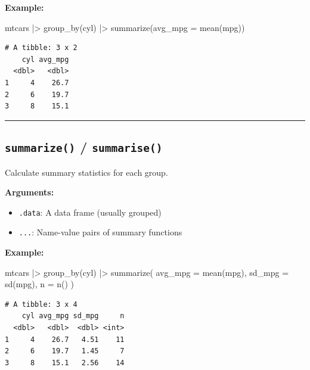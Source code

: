 \documentclass[
  letterpaper,
  DIV=11,
  numbers=noendperiod]{scrreprt}
\newenvironment{Shaded}{\begin{snugshade}}{\end{snugshade}}
\newcommand{\AttributeTok}[1]{\textcolor[rgb]{0.40,0.45,0.13}{#1}}
\newcommand{\FunctionTok}[1]{\textcolor[rgb]{0.28,0.35,0.67}{#1}}
\newcommand{\NormalTok}[1]{\textcolor[rgb]{0.00,0.23,0.31}{#1}}
\newcommand{\SpecialCharTok}[1]{\textcolor[rgb]{0.37,0.37,0.37}{#1}}
\providecommand{\tightlist}{%
  \setlength{\itemsep}{0pt}\setlength{\parskip}{0pt}}
\begin{document}
\textbf{Example:}

\begin{Shaded}
\begin{Highlighting}[]
\NormalTok{mtcars }\SpecialCharTok{|\textgreater{}}
  \FunctionTok{group\_by}\NormalTok{(cyl) }\SpecialCharTok{|\textgreater{}}
  \FunctionTok{summarize}\NormalTok{(}\AttributeTok{avg\_mpg =} \FunctionTok{mean}\NormalTok{(mpg))}
\end{Highlighting}
\end{Shaded}

\begin{verbatim}
# A tibble: 3 x 2
    cyl avg_mpg
  <dbl>   <dbl>
1     4    26.7
2     6    19.7
3     8    15.1
\end{verbatim}

\begin{center}\rule{0.5\linewidth}{0.5pt}\end{center}

\subsection{\texorpdfstring{\texttt{summarize()} /
\texttt{summarise()}}{summarize() / summarise()}}\label{summarize-summarise}

Calculate summary statistics for each group.

\textbf{Arguments:}

\begin{itemize}
\tightlist
\item
  \texttt{.data}: A data frame (usually grouped)
\item
  \texttt{...}: Name-value pairs of summary functions
\end{itemize}

\textbf{Example:}

\begin{Shaded}
\begin{Highlighting}[]
\NormalTok{mtcars }\SpecialCharTok{|\textgreater{}}
  \FunctionTok{group\_by}\NormalTok{(cyl) }\SpecialCharTok{|\textgreater{}}
  \FunctionTok{summarize}\NormalTok{(}
    \AttributeTok{avg\_mpg =} \FunctionTok{mean}\NormalTok{(mpg),}
    \AttributeTok{sd\_mpg =} \FunctionTok{sd}\NormalTok{(mpg),}
    \AttributeTok{n =} \FunctionTok{n}\NormalTok{()}
\NormalTok{  )}
\end{Highlighting}
\end{Shaded}

\begin{verbatim}
# A tibble: 3 x 4
    cyl avg_mpg sd_mpg     n
  <dbl>   <dbl>  <dbl> <int>
1     4    26.7   4.51    11
2     6    19.7   1.45     7
3     8    15.1   2.56    14
\end{verbatim}
\end{document}
